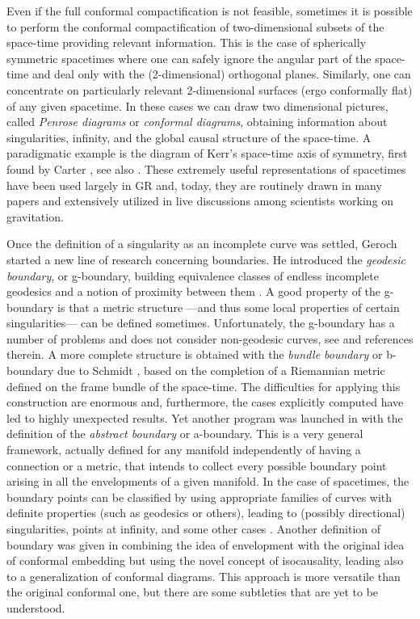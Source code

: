 \documentclass[12pt]{iopart}
\begin{document}
Even if the full conformal compactification is not feasible, sometimes it is possible to perform the conformal
compactification of two-dimensional subsets of the space-time providing
relevant information.  This is the case of
spherically symmetric spacetimes where one can safely ignore the angular part of the space-time and deal only with the (2-dimensional) orthogonal planes. Similarly, one can concentrate on
particularly relevant 2-dimensional surfaces (ergo conformally flat) of any given spacetime.  In these cases we can draw two dimensional
pictures, called {\em Penrose diagrams} \cite{P00,P3} or {\em conformal diagrams}, obtaining information about singularities, infinity, and the global causal structure of the space-time.  A paradigmatic
example is the diagram of Kerr's space-time  axis of
symmetry, first found by Carter \cite{Ca0}, see also \cite{HE}. These extremely useful representations of spacetimes have been used largely in GR \cite{HE,Wald,S1} and, today, they are routinely drawn in many papers and extensively utilized in live discussions among scientists working on gravitation.

 
Once the definition of a singularity as an incomplete curve was settled, Geroch started a new line of research concerning boundaries. He introduced the {\em geodesic boundary}, or g-boundary, building equivalence classes of endless
incomplete geodesics and a notion of proximity between them \cite{Ge1}. A good property of the g-boundary is that a metric structure ---and thus some local properties of
certain singularities--- can be defined sometimes.
Unfortunately, the g-boundary has a number of problems and does not consider
non-geodesic curves, see \cite{RSh,GS} and references therein. A more complete structure is obtained with the
{\it bundle boundary} or b-boundary due to Schmidt \cite{Sc,Sc2}, based on the completion of a Riemannian metric defined on the frame bundle of the space-time. The difficulties for applying this construction are enormous and, furthermore, the cases explicitly computed have led to highly unexpected results. Yet another program was launched in 
 \cite{SS2} with the definition of the {\em abstract boundary} or a-boundary. This is a very general framework, actually 
defined for any manifold independently of having a connection or a metric, that intends to collect
every possible boundary point arising in all the envelopments of a given manifold. In the
case of spacetimes, the boundary points can be classified by using appropriate
families of curves with definite properties (such as geodesics or others),
leading to (possibly directional) singularities, points at infinity, and some
other cases \cite{SS2}. Another definition of boundary was given in \cite{GS0} combining the idea of envelopment with the original idea of conformal embedding but using the novel concept of isocausality, leading also to a generalization of conformal diagrams. This approach is more versatile than the original conformal one, but there are some subtleties \cite{FHS0} that are yet to be understood.
\end{document}
